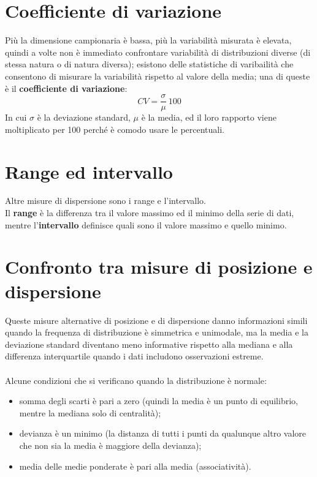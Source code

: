 \documentclass[drafts, 10pt]{book}
\begin{document}
\section{Coefficiente di variazione}
Più la dimensione campionaria è bassa, più la variabilità misurata è elevata, quindi a volte non è immediato confrontare variabilità di distribuzioni diverse (di stessa natura o di natura diversa); esistono delle statistiche di varibailità che consentono di misurare la variabilità rispetto al valore della media; una di queste è il \textbf{coefficiente di variazione}:
\begin{equation}
    CV = \frac{\sigma}{\mu}\ 100
\end{equation}
In cui $\sigma$ è la deviazione standard, $\mu$ è la media, ed il loro rapporto viene moltiplicato per 100 perché è comodo usare le percentuali.

\section{Range ed intervallo}
Altre misure di dispersione sono i range e l’intervallo.
\\
Il \textbf{range} è la differenza tra il valore massimo ed il minimo della serie di dati, mentre l’\textbf{intervallo} definisce quali sono il valore massimo e quello minimo.

\section{Confronto tra misure di posizione e dispersione}
Queste misure alternative di posizione e di dispersione danno informazioni simili quando la frequenza di distribuzione è simmetrica e unimodale, ma la media e la deviazione standard diventano meno informative rispetto alla mediana e alla differenza interquartile quando i dati includono osservazioni estreme.
\\
\\
Alcune condizioni che si verificano quando la distribuzione è normale:
\begin{itemize}
    \item somma degli scarti è pari a zero (quindi la media è un punto di equilibrio, mentre la mediana solo di centralità);
    \item devianza è un minimo (la distanza di tutti i punti da qualunque altro valore che non sia la media è maggiore della devianza);
    \item media delle medie ponderate è pari alla media (associatività).
\end{itemize}
\end{document}
